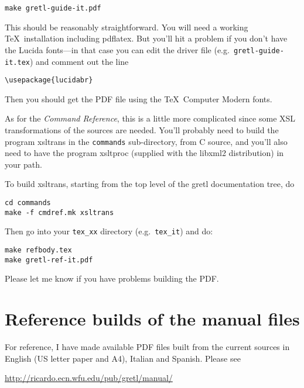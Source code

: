 \documentclass{article}
\begin{document}
\begin{verbatim}
make gretl-guide-it.pdf
\end{verbatim}

This should be reasonably straightforward.  You will need a working
\TeX\ installation including \textsf{pdflatex}.  But you'll hit a
problem if you don't have the \textsf{Lucida} fonts---in that case you
can edit the driver file (e.g.\ \texttt{gretl-guide-it.tex}) and
comment out the line
%
\begin{verbatim}
\usepackage{lucidabr}
\end{verbatim}
%
Then you should get the PDF file using the \TeX\ Computer Modern
fonts.

As for the \textit{Command Reference}, this is a little more
complicated since some XSL transformations of the sources are needed.
You'll probably need to build the program \textsf{xsltrans} in the
\texttt{commands} sub-directory, from C source, and you'll also need
to have the program \textsf{xsltproc} (supplied with the
\textsf{libxml2} distribution) in your path.

To build \textsf{xsltrans}, starting from the top level of the
\textsf{gretl} documentation tree, do

\begin{verbatim}
cd commands
make -f cmdref.mk xsltrans
\end{verbatim}

Then go into your \texttt{tex\_xx} directory (e.g.\ \texttt{tex\_it})
and do:

\begin{verbatim}
make refbody.tex
make gretl-ref-it.pdf
\end{verbatim}

Please let me know if you have problems building the PDF.

\section{Reference builds of the manual files}

For reference, I have made available PDF files built from the current
sources in English (US letter paper and A4), Italian and Spanish.
Please see

\begin{center}
\url{http://ricardo.ecn.wfu.edu/pub/gretl/manual/} 
\end{center}
\end{document}

